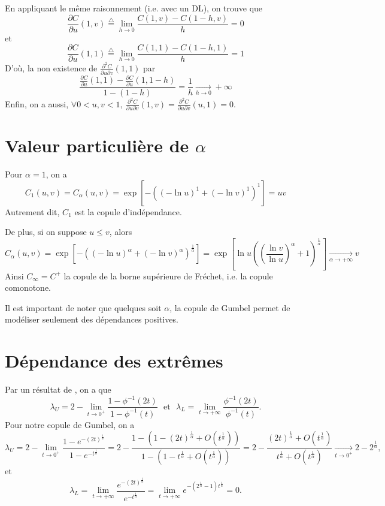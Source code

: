 \documentclass[11pt]{article}
\newcommand{\txtm}[1]{\textrm{~~#1~~}}
\begin{document}
\begin{small}
En appliquant le m\^eme raisonnement (i.e. avec un DL), on trouve que 
$$
\frac{\partial C}{\partial u }(1,v) \stackrel{\triangle}{=} \underset{h\rightarrow 0}{\lim} \frac{C(1,v)-C(1-h,v)}{h} = 0
$$
et
$$
\frac{\partial C}{\partial u }(1,1) \stackrel{\triangle}{=} \underset{h\rightarrow 0}{\lim} \frac{C(1,1)-C(1-h,1)}{h} = 1
$$
D'o\`u, la non existence de  $\frac{\partial^2 C}{\partial u \partial v}(1,1)$ par
$$
\frac{\frac{\partial C}{\partial u }(1,1)-\frac{\partial C}{\partial u }(1,1-h)}{1-(1-h)} =\frac{1}{h}\underset{h\rightarrow 0}{\longrightarrow} +\infty
$$
Enfin, on a aussi, $\forall 0<u,v<1,~\frac{\partial^2 C}{\partial u \partial v}(1,v) = \frac{\partial^2 C}{\partial u \partial v}(u,1)=0$.

\section{Valeur particuli\`ere de $\alpha$}
\label{parametreDemo}
Pour $\alpha=1$, on a 
$$
C_1(u,v) = C_\alpha\left(u,v\right)=\exp\left[-\left(\left(-\ln u\right)^1+\left(-\ln v\right)^1\right)^1\right] = uv
$$
Autrement dit, $C_1$ est la copule d'ind\'ependance.

De plus, si on suppose $u\leq v$, alors
$$
C_\alpha(u,v) = \exp\left[-\left(\left(-\ln u\right)^\alpha+\left(-\ln v\right)^\alpha\right)^{\frac{1}{\alpha}}\right] 
      =  \exp \left[  \ln u \left(\left(\frac{\ln v}{\ln u}\right)^\alpha+1\right)^{\frac{1}{\alpha}}\right] 
      \underset{\alpha\rightarrow +\infty}{\longrightarrow} v
$$
Ainsi $C_\infty = C^+$ la copule de la borne sup\'erieure de Fr\'echet, i.e. la copule comonotone.

Il est important de noter que quelques soit $\alpha$, la copule de Gumbel permet de mod\'eliser seulement des d\'ependances positives.


\section{D\'ependance des extr\^emes}
\label{extreme}
Par un r\'esultat de \cite{nelsen}, on a que 
$$\lambda_U =2-\underset{t\rightarrow0^+}{\lim} \frac{1-\phi^{-1}(2t) }{1-\phi^{-1}(t)} \txtm{et}
\lambda_L = \underset{t\rightarrow +\infty}{\lim} \frac{\phi^{-1}(2t) }{\phi^{-1}(t)}.
$$
Pour notre copule de Gumbel, on a 
$$
\lambda_U =2-\underset{t\rightarrow0^+}{\lim} \frac{1- e^{-(2t)^\frac{1}{\alpha}} }{1- e^{-t^\frac{1}{\alpha}} }
= 2- \frac{1- \left(1-(2t)^\frac{1}{\alpha}  +O\left(t^\frac{1}{\alpha}\right)\right) }{1- \left(1-t^\frac{1}{\alpha} +O\left(t^\frac{1}{\alpha}\right)\right) }
= 2- \frac{ (2t)^\frac{1}{\alpha}  +O\left(t^\frac{1}{\alpha}\right) }{ t^\frac{1}{\alpha} +O\left(t^\frac{1}{\alpha}\right) }
\underset{t\rightarrow0^+}{\longrightarrow} 2- 2^\frac{1}{\alpha},
$$
et 
$$
\lambda_L = \underset{t\rightarrow +\infty}{\lim} \frac{ e^{-(2t)^\frac{1}{\alpha}}  }{ e^{-t^\frac{1}{\alpha}} }
= \underset{t\rightarrow +\infty}{\lim} e^{ - (2^\frac{1}{\alpha}-1)t^\frac{1}{\alpha} } =0.
$$




\end{small}
\end{document}
